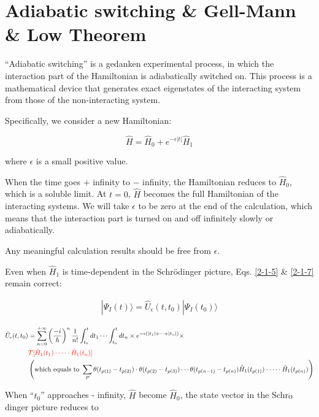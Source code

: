 \section{Adiabatic switching \& Gell-Mann \& Low Theorem}

``Adiabatic switching'' is a gedanken experimental process, in which the interaction part of the Hamiltonian is adiabatically switched on. This process is a mathematical device that generates exact eigenstates of the interacting system from those of the non-interacting system. 

Specifically, we consider a new Hamiltonian:

\[\hat{H}=\hat{H}_0+e^{-\epsilon|t|}\hat{H}_1 \]

where $\epsilon$ is a small positive value. 

When the time goes $+$ infinity to $-$ infinity, the Hamiltonian reduces to $\hat{H}_0$, which is a soluble limit. At $t=0$, $\hat{H}$ becomes the full Hamiltonian of the interacting systems. We will take $\epsilon$ to be zero at the end of the calculation, which means that the interaction part is turned on and off infinitely slowly or adiabatically. 

Any meaningful calculation results should be free from $\epsilon$. 

Even when $\hat{H}_1$ is time-dependent in the Schr\"{o}dinger picture, Eqs. \eqref{2-1-5} \& \eqref{2-1-7} remain correct:

\begin{align}
|\Psi_I(t)\rangle=\hat{U}_\epsilon(t,t_0)|\Psi_I(t_0)\rangle
\end{align}

\begin{align}\label{2-2-2}
\hat{U}_\epsilon(t,t_0)&=\sum_{n=0}^{+\infty}\left(\frac{-i}{\hbar}\right)^n\frac{1}{n!}\int_{t_0}^t dt_1 \cdots \int_{t_0}^t dt_n\times e^{-\epsilon(|t_1|+\cdots+|t_n|)}\times\\
\nonumber&{\color{red}{T[\hat{H}_1(t_1)\cdot\cdots\cdot\hat{H}_1(t_n)]}}\\
\nonumber&\left(\text{which equals to\ }\sum_P\theta(t_{p(1)}-t_{p(2)})\cdot\theta(t_{p(2)}-t_{p(3)})\cdots\theta(t_{p(n-1)}-t_{p(n)}) \hat{H}_1(t_{p(1)})\cdot\cdots\cdot\hat{H}_1(t_{p(n)})\right)
\end{align}



When ``$t_0$'' approaches - infinity, $\hat{H}$ become $\hat{H}_0$, the state vector in the Schr$\ddot{\text{o}}$dinger picture reduces to

